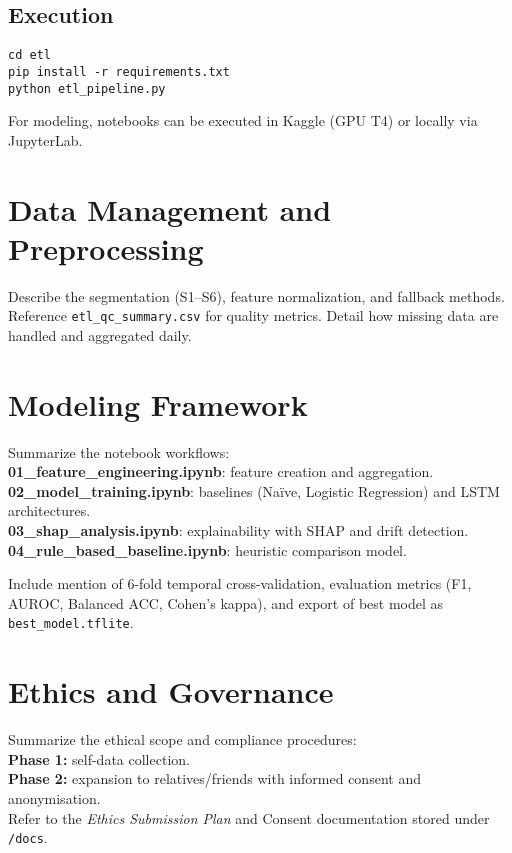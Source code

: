 \documentclass[12pt,a4paper]{article}
\begin{document}
\subsection{Execution}
\begin{verbatim}
cd etl
pip install -r requirements.txt
python etl_pipeline.py
\end{verbatim}
For modeling, notebooks can be executed in Kaggle (GPU T4) or locally via JupyterLab.

\section{Data Management and Preprocessing}
Describe the segmentation (S1–S6), feature normalization, and fallback methods. Reference \texttt{etl_qc_summary.csv} for quality metrics. Detail how missing data are handled and aggregated daily.

\section{Modeling Framework}
Summarize the notebook workflows:\\
\textbf{01\_feature\_engineering.ipynb}: feature creation and aggregation.\\
\textbf{02\_model\_training.ipynb}: baselines (Naïve, Logistic Regression) and LSTM architectures.\\
\textbf{03\_shap\_analysis.ipynb}: explainability with SHAP and drift detection.\\
\textbf{04\_rule\_based\_baseline.ipynb}: heuristic comparison model.

Include mention of 6-fold temporal cross-validation, evaluation metrics (F1, AUROC, Balanced ACC, Cohen’s kappa), and export of best model as \texttt{best\_model.tflite}.

\section{Ethics and Governance}
Summarize the ethical scope and compliance procedures:\\
\textbf{Phase 1:} self-data collection.\\
\textbf{Phase 2:} expansion to relatives/friends with informed consent and anonymisation.\\
Refer to the \textit{Ethics Submission Plan} and Consent documentation stored under \texttt{/docs}.
\end{document}
